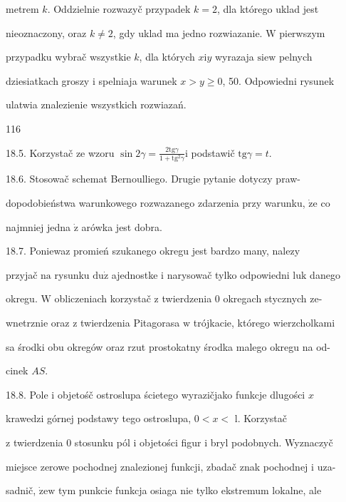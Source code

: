 \documentclass[a4paper,12pt]{article}
\begin{document}
metrem $k$. Oddzielnie rozwazyč przypadek $k = 2$, dla którego uklad jest

nieoznaczony, oraz $k\neq 2$, gdy uklad ma jedno rozwiazanie. $\mathrm{W}$ pierwszym

przypadku wybrač wszystkie $k$, dla których $x\mathrm{i}y$ wyrazaja $\mathrm{s}\mathrm{i}\mathrm{e}\mathrm{w}$ pelnych

dziesiatkach groszy $\mathrm{i}$ spelniaja warunek $x>y\geq 0$, 50. Odpowiedni rysunek

ulatwia znalezienie wszystkich rozwiazań.





116

18.5. Korzystač ze wzoru $\displaystyle \sin 2\gamma=\frac{2\mathrm{t}\mathrm{g}\gamma}{1+\mathrm{t}\mathrm{g}^{2}\gamma} \mathrm{i}$ podstawič $\mathrm{t}\mathrm{g}\gamma=t.$

18.6. Stosowač schemat Bernoulliego. Drugie pytanie dotyczy praw-

dopodobieństwa warunkowego rozwazanego zdarzenia przy warunku, $\dot{\mathrm{z}}\mathrm{e}$ co

najmniej jedna $\dot{\mathrm{z}}$ arówka jest dobra.

18.7. Poniewaz promień szukanego okregu jest bardzo many, nalezy

przyjač $\mathrm{n}\mathrm{a}$ rysunku $\mathrm{d}\mathrm{u}\dot{\mathrm{z}}$ ajednostke $\mathrm{i}$ narysowač tylko odpowiedni $\mathrm{l}\mathrm{u}\mathrm{k}$ danego

okregu. $\mathrm{W}$ obliczeniach korzystač $\mathrm{z}$ twierdzenia $0$ okregach stycznych ze-

wnetrznie oraz $\mathrm{z}$ twierdzenia Pitagorasa $\mathrm{w}$ trójkacie, którego wierzcholkami

sa środki obu okregów oraz rzut prostokatny środka malego okregu na od-

cinek $AS.$

18.8. Pole $\mathrm{i}$ objetośč ostroslupa ścietego wyrazičjako funkcje dlugości $x$

krawedzi górnej podstawy tego ostroslupa, $0 < x <$ l. Korzystač

$\mathrm{z}$ twierdzenia $0$ stosunku pól $\mathrm{i}$ objetości figur $\mathrm{i}$ bryl podobnych. Wyznaczyč

miejsce zerowe pochodnej znalezionej funkcji, zbadač znak pochodnej $\mathrm{i}$ uza-

sadnič, $\dot{\mathrm{z}}\mathrm{e}\mathrm{w}$ tym punkcie funkcja osiaga nie tylko ekstremum lokalne, ale
\end{document}
